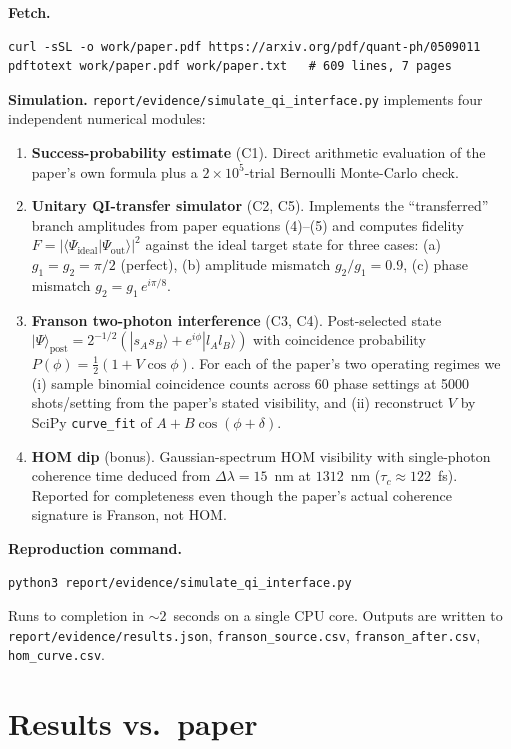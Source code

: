 \documentclass[11pt]{article}
\begin{document}
\textbf{Fetch.}
\begin{verbatim}
curl -sSL -o work/paper.pdf https://arxiv.org/pdf/quant-ph/0509011
pdftotext work/paper.pdf work/paper.txt   # 609 lines, 7 pages
\end{verbatim}

\textbf{Simulation.} \texttt{report/evidence/simulate\_qi\_interface.py}
implements four independent numerical modules:

\begin{enumerate}
\item \textbf{Success-probability estimate} (C1). Direct arithmetic evaluation
    of the paper's own formula plus a $2\times 10^5$-trial Bernoulli Monte-Carlo
    check.
\item \textbf{Unitary QI-transfer simulator} (C2, C5). Implements the ``transferred''
    branch amplitudes from paper equations (4)--(5) and computes fidelity
    $F = |\langle \Psi_{\text{ideal}} | \Psi_{\text{out}}\rangle|^2$ against the
    ideal target state for three cases:
    (a) $g_1 = g_2 = \pi/2$ (perfect),
    (b) amplitude mismatch $g_2/g_1 = 0.9$,
    (c) phase mismatch $g_2 = g_1\,e^{i\pi/8}$.
\item \textbf{Franson two-photon interference} (C3, C4). Post-selected state
    $|\Psi\rangle_{\text{post}} = 2^{-1/2}(|s_A s_B\rangle + e^{i\phi}|l_A l_B\rangle)$
    with coincidence probability $P(\phi) = \frac12(1 + V\cos\phi)$.
    For each of the paper's two operating regimes we (i) sample binomial coincidence
    counts across 60 phase settings at 5000 shots/setting from the paper's stated
    visibility, and (ii) reconstruct $V$ by SciPy \texttt{curve\_fit} of
    $A + B\cos(\phi + \delta)$.
\item \textbf{HOM dip} (bonus). Gaussian-spectrum HOM visibility with
    single-photon coherence time deduced from $\Delta\lambda = 15$~nm at
    $1312$~nm ($\tau_c \approx 122$~fs). Reported for completeness even though
    the paper's actual coherence signature is Franson, not HOM.
\end{enumerate}

\textbf{Reproduction command.}
\begin{verbatim}
python3 report/evidence/simulate_qi_interface.py
\end{verbatim}
Runs to completion in $\sim 2$~seconds on a single CPU core. Outputs are written
to \texttt{report/evidence/results.json}, \texttt{franson\_source.csv},
\texttt{franson\_after.csv}, \texttt{hom\_curve.csv}.

\section{Results vs.\ paper}
\label{sec:results}
\end{document}
